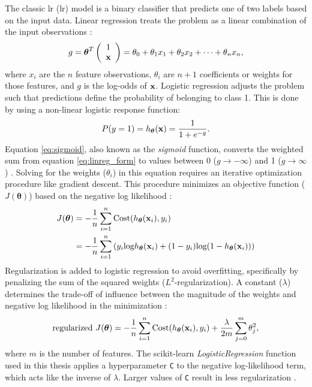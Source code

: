 The classic \acrlong{lr} (\acrshort{lr}) model is a binary classifier that predicts one of two labels based on the input data. Linear regression treats the problem as a linear combination of the input observations \citep[p.\ 369]{bertsimas_analytics_2016}:
\begin{equation}
\label{eq:linreg_form}
    g = {\boldsymbol\theta}^T\left(\begin{array}{c}1\\{\bf x}\end{array}\right) = \theta_0 + \theta_1x_1 + \theta_2x_2 + \cdots + \theta_nx_n, 
\end{equation}
where $x_i$ are the $n$ feature observations, $\theta_i$ are $n+1$ coefficients or weights for those features, and $g$ is the log-odds of $\bf x$. Logistic regression adjusts the problem such that predictions define the probability of belonging to class 1. This is done by using a non-linear logistic response function: 
\begin{equation}
\label{eq:sigmoid}
P(y=1)=h_{\boldsymbol\theta}({\bf x}) = \frac{1}{1+e^{-g}}.
\end{equation}
Equation \ref{eq:sigmoid}, also known as the \textit{sigmoid} function, converts the weighted sum from equation \ref{eq:linreg_form} to values between 0 ($g\to-\infty$) and 1 ($g\to\infty$) \citep[p.\ 369]{bertsimas_analytics_2016}. Solving for the weights ($\theta_i$) in this equation requires an iterative optimization procedure like gradient descent. This procedure minimizes an objective function ($J(\boldsymbol\theta)$) based on the negative log likelihood \citep{ng_logistic_2011}:
\begin{equation}
\label{eq:logreg_cost}
\begin{aligned}
        J(\boldsymbol\theta) &= -\frac{1}{n} \sum_{i=1}^{n}{\text{Cost}(h_{\boldsymbol\theta}({\bf x}_i),y_i)} \\ &= -\frac{1}{n}\sum_{i=1}^{n}{(y_i\text{log}{h_{\boldsymbol\theta}({\bf x}_i)}+(1-y_i)\text{log}(1-h_{\boldsymbol\theta}({\bf x}_i)))}
\end{aligned}
\end{equation}
Regularization is added to logistic regression to avoid overfitting, specifically by penalizing the sum of the squared weights ($L^2$-regularization). A constant ($\lambda$) determines the trade-off of influence between the magnitude of the weights and negative log likelihood in the minimization \citep{ng_regularization_2011}:
\begin{equation}
\label{eq:logreg_cost_reg}
    \text{regularized}~J(\boldsymbol\theta) = -\frac{1}{n}\sum_{i=1}^{n}{\text{Cost}(h_{\boldsymbol\theta}({\bf x}_i),y_i) + \frac{\lambda}{2m}\sum_{j=0}^{m}{\theta_j^2}},
\end{equation}
where $m$ is the number of features. The scikit-learn \textit{LogisticRegression} function used in this thesis applies a hyperparameter \verb|C| to the negative log-likelihood term, which acts like the inverse of $\lambda$. Larger values of \verb|C| result in less regularization \citep{scikit-learn_logistic_2021}.

